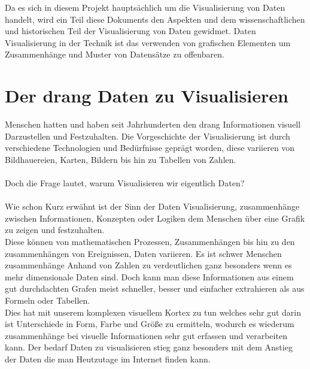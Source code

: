 
Da es sich in diesem Projekt hauptsächlich um die Visualisierung von Daten handelt, wird ein Teil diese Dokuments den Aspekten und dem
wissenschaftlichen und historischen Teil der Visualisierung von Daten gewidmet. Daten Visualisierung in der Technik ist das verwenden von
grafischen Elementen um Zusammenhänge und Muster von Datensätze zu offenbaren.  

\section{Der drang Daten zu Visualisieren}
Menschen hatten und haben seit Jahrhunderten den drang Informationen visuell Darzustellen und Festzuhalten. Die Vorgeschichte der Visualisierung
ist durch verschiedene Technologien und Bedürfnisse geprägt worden, diese variieren von Bildhauereien, Karten, Bildern bis hin zu Tabellen
von Zahlen.\\ \\
Doch die Frage lautet, warum Visualisieren wir eigentlich Daten? \\ \\
Wie schon Kurz erwähnt ist der Sinn der Daten Visualisierung, zusammenhänge zwischen Informationen, Konzepten oder Logiken dem Menschen über
eine Grafik zu zeigen und festzuhalten.  \\
Diese können von mathematischen Prozessen, Zusammenhängen bis hin zu den zusammenhängen von Ereignissen, Daten variieren. Es ist schwer
Menschen zusammenhänge Anhand von Zahlen zu verdeutlichen ganz besonders wenn es mehr dimensionale Daten sind. Doch kann man diese
Informationen aus einem gut durchdachten Grafen meist schneller, besser und einfacher extrahieren als aus Formeln oder Tabellen. \\ 
Dies hat mit unserem komplexen visuellem Kortex zu tun welches sehr gut darin ist Unterschiede in Form, Farbe und Größe zu ermitteln, wodurch
es wiederum zusammenhänge bei visuelle Informationen sehr gut erfassen und verarbeiten kann. Der bedarf Daten zu visualisieren stieg ganz
besonders mit dem Anstieg der Daten die man Heutzutage im Internet finden kann. \newpage

